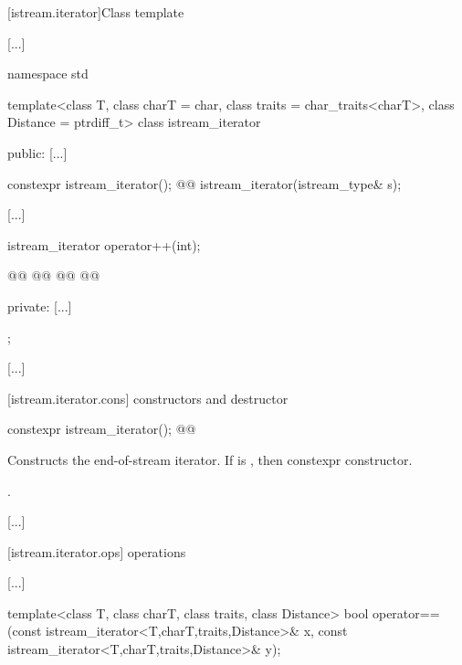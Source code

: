 [istream.iterator]{Class template }

[...]

\begin{codeblock}
namespace std {
  template<class T, class charT = char, class traits = char_traits<charT>,
           class Distance = ptrdiff_t>
  class istream_iterator {
  public:
    [...]

    constexpr istream_iterator();
    @@
    istream_iterator(istream_type& s);

    [...]

    istream_iterator  operator++(int);

    @@
    @@
    @@
    @@

  private:
    [...]
  };

  [...]
}
\end{codeblock}

[istream.iterator.cons]{ constructors and destructor}

%
\begin{itemdecl}
constexpr istream_iterator();
@@
\end{itemdecl}

\begin{itemdescr}
\pnum
\effects
Constructs the end-of-stream iterator.
If  is ,
then  constexpr
constructor.

\pnum
\ensures {}.
\end{itemdescr}

[...]

[istream.iterator.ops]{ operations}

[...]

\setcounter{Paras}{7}
%
\begin{itemdecl}
template<class T, class charT, class traits, class Distance>
  bool operator==(const istream_iterator<T,charT,traits,Distance>& x,
                  const istream_iterator<T,charT,traits,Distance>& y);
\end{itemdecl}

